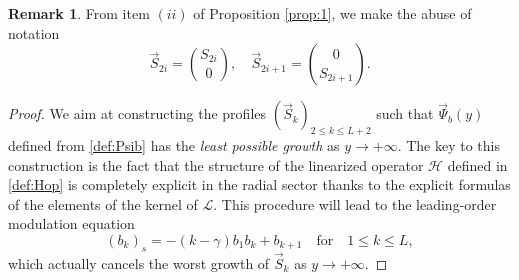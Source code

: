 \documentclass[11pt]{aims}
\theoremstyle{definition}
\newtheorem{remark}[theorem]{Remark}
\numberwithin{equation}{section}
\begin{document}
\begin{remark} From item $(ii)$ of Proposition \ref{prop:1}, we make the abuse of notation 
\begin{equation}\label{eq:formSk}
\vec{S}_{2i} = \binom{S_{2i}}{0}, \quad \vec S_{2i +1} = \binom{0}{S_{2i  +1}}.
\end{equation}
\end{remark}

\begin{proof} We aim at constructing the profiles $(\vec S_k)_{2 \leq k \leq L+2}$ such that $\vec \Psi_b(y)$ defined from \eqref{def:Psib} has the \emph{least possible growth} as $y \to +\infty$. The key to this construction is the fact that the structure of the linearized operator ${\mathscr{H}}$ defined in \eqref{def:Hop} is completely explicit in the radial sector thanks to the explicit formulas of the elements of the kernel of ${\mathscr{L}}$. This procedure will lead to the leading-order modulation equation
\begin{equation}
(b_k)_s = -(k - \gamma)b_1b_k + b_{k+1} \quad \text{for}\quad 1 \leq k \leq L,
\end{equation}
which actually cancels the worst growth of $\vec S_k$ as $y \to +\infty$.


\end{proof}
\end{document}
